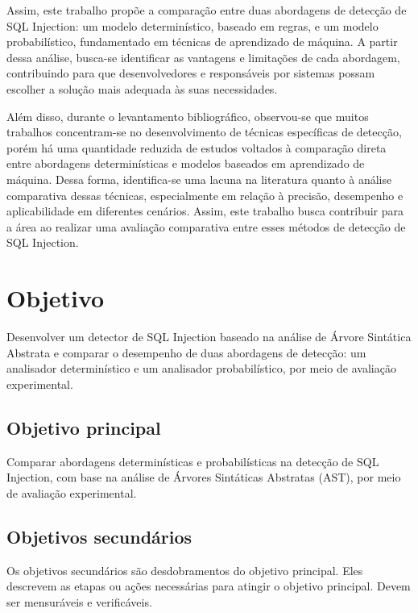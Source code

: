 \documentclass[
    12pt,                %
    openright,           %
    oneside,             %
    a4paper,             %
    english,             %
    brazil               %
]{abntex2}
\begin{document}
Assim, este trabalho propõe a comparação entre duas abordagens de detecção de SQL Injection: um modelo determinístico, baseado em regras, e um modelo probabilístico, fundamentado em técnicas de aprendizado de máquina. A partir dessa análise, busca-se identificar as vantagens e limitações de cada abordagem, contribuindo para que desenvolvedores e responsáveis por sistemas possam escolher a solução mais adequada às suas necessidades. 

Além disso, durante o levantamento bibliográfico, observou-se que muitos trabalhos concentram-se no desenvolvimento de técnicas específicas de detecção, porém há uma quantidade reduzida de estudos voltados à comparação direta entre abordagens determinísticas e modelos baseados em aprendizado de máquina. Dessa forma, identifica-se uma lacuna na literatura quanto à análise comparativa dessas técnicas, especialmente em relação à precisão, desempenho e aplicabilidade em diferentes cenários. Assim, este trabalho busca contribuir para a área ao realizar uma avaliação comparativa entre esses métodos de detecção de SQL Injection.
\section{Objetivo}
\label{sec:objetivo}

Desenvolver um detector de SQL Injection baseado na análise de Árvore Sintática Abstrata e comparar o desempenho de duas abordagens de detecção: um analisador determinístico e um analisador probabilístico, por meio de avaliação experimental. 

\subsection{Objetivo principal}

Comparar abordagens determinísticas e probabilísticas na detecção de SQL Injection, com base na análise de Árvores Sintáticas Abstratas (AST), por meio de avaliação experimental. 

\subsection{Objetivos secundários}

Os objetivos secundários são desdobramentos do objetivo principal. Eles descrevem as etapas ou ações necessárias para atingir o objetivo principal. Devem ser mensuráveis e verificáveis.
\end{document}
